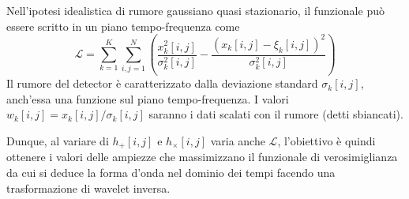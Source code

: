 Nell'ipotesi idealistica di rumore gaussiano quasi stazionario, il funzionale può essere scritto in un piano tempo-frequenza come
\begin{equation}
	\mathcal{L} = \sum_{k=1}^{K}\sum_{i,j=1}^{N}\left(\frac{x_k^2[i,j]}{\sigma_k^2[i,j]} - \frac{(x_k[i,j]-\xi_k[i,j])^2}{\sigma_k^2[i,j]}  \right)
	\label{eqn:Likelihood}
\end{equation}
Il rumore del detector è caratterizzato dalla deviazione standard $\sigma_k[i,j]$,  anch'essa una funzione sul piano tempo-frequenza. I valori $w_k[i,j] = x_k[i,j]/\sigma_k[i,j]$ saranno i dati scalati con il rumore (detti sbiancati)\cite{Klimenko_2016}.



Dunque, al variare di $h_{+}[i,j]$ e $h_{\times}[i,j]$ varia anche $\mathcal{L}$, l'obiettivo è quindi ottenere i valori delle ampiezze che massimizzano il funzionale di verosimiglianza da cui si deduce la forma d'onda nel dominio dei tempi facendo una trasformazione di wavelet inversa.%

